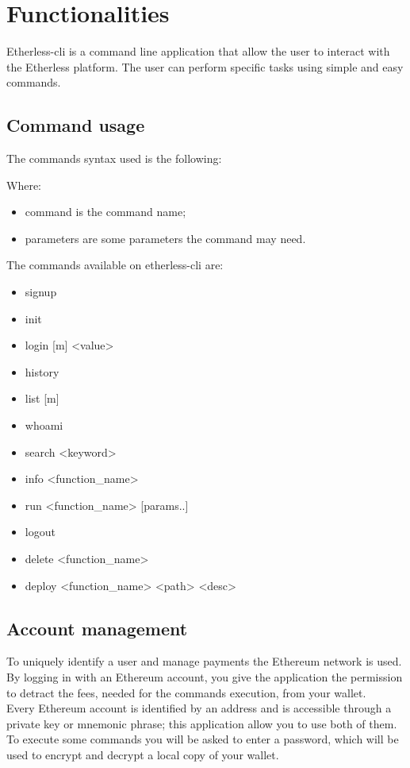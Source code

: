 \section{Functionalities}
Etherless-cli is a command line application that allow the user to interact with the Etherless platform. The user can perform specific tasks using simple and easy commands.

\subsection{Command usage}
The commands syntax used is the following:
\begin{center}
\end{center}
Where:
\begin{itemize}
	\item command is the command name;
	\item parameters are some parameters the command may need.
\end{itemize}

\noindent The commands available on etherless-cli are:
\begin{itemize}
	\item signup
	\item init
	\item login [m] <value>
	\item history
	\item list [m]
	\item whoami
	\item search <keyword>
	\item info <function\_name>
	\item run <function\_name> [params..]
	\item logout
	\item delete <function\_name>
	\item deploy <function\_name> <path> <desc>
\end{itemize}

\subsection{Account management}
To uniquely identify a user and manage payments the Ethereum network is used. By logging in with an Ethereum account, you give the application the permission to detract the fees, needed for the commands execution, from your wallet. \\
Every Ethereum account is identified by an address and is accessible through a private key or mnemonic phrase; this application allow you to use both of them. \\
To execute some commands you will be asked to enter a password, which will be used to encrypt and decrypt a local copy of your wallet.

